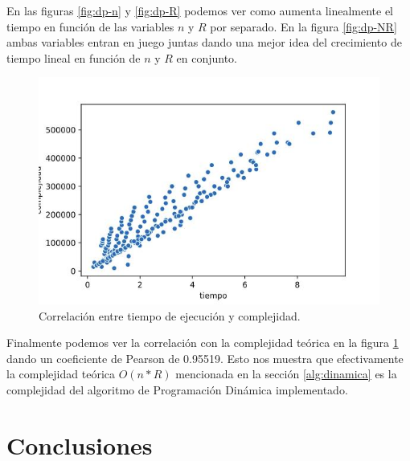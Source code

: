 \documentclass[10pt,a4paper]{article}
\begin{document}
En las figuras \ref{fig:dp-n} y \ref{fig:dp-R} podemos ver como aumenta linealmente el tiempo en función de las variables $n$ y $R$ por separado. En la figura \ref{fig:dp-NR} ambas variables entran en juego juntas dando una mejor idea del crecimiento de tiempo lineal en función de $n$ y $R$ en conjunto.
\newline
\begin{figure}[h!]
	\centering
	\includegraphics[scale=0.35]{img/dp-correlacion.jpg}
	\caption{Correlación entre tiempo de ejecución y complejidad.}
	\label{fig:dp-complejidad}
\end{figure}
\newline
Finalmente podemos ver la correlación con la complejidad teórica en la figura \ref{fig:dp-complejidad} dando un coeficiente de Pearson de 0.95519. Esto nos muestra que efectivamente la complejidad teórica $O(n*R)$ mencionada en la sección \ref{alg:dinamica} es la complejidad del algoritmo de Programación Dinámica implementado.
\newpage

\section{Conclusiones} \label{sec:conclusiones}

\newpage
\nocite{*}
\end{document}

